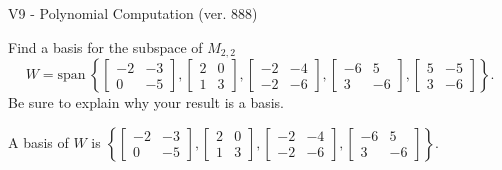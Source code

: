 \begin{exercise}
  \begin{exerciseTitle}V9 - Polynomial Computation (ver. 888)\end{exerciseTitle}
  \begin{exerciseStatement}
    Find a basis for the subspace of \(M_{2,2}\) 
\[W=\mathrm{span}\ \left\{\left[\begin{array}{cc}
-2 & -3 \\
0 & -5
\end{array}\right] , \left[\begin{array}{cc}
2 & 0 \\
1 & 3
\end{array}\right] , \left[\begin{array}{cc}
-2 & -4 \\
-2 & -6
\end{array}\right] , \left[\begin{array}{cc}
-6 & 5 \\
3 & -6
\end{array}\right] , \left[\begin{array}{cc}
5 & -5 \\
3 & -6
\end{array}\right]\right\}.\]
 Be sure to explain why your result is a basis.


  \end{exerciseStatement}
  \begin{exerciseAnswer}
   A basis of \(W\) is  \(\left\{\left[\begin{array}{cc}
-2 & -3 \\
0 & -5
\end{array}\right] , \left[\begin{array}{cc}
2 & 0 \\
1 & 3
\end{array}\right] , \left[\begin{array}{cc}
-2 & -4 \\
-2 & -6
\end{array}\right] , \left[\begin{array}{cc}
-6 & 5 \\
3 & -6
\end{array}\right]\right\}\).
  


  \end{exerciseAnswer}
\end{exercise}